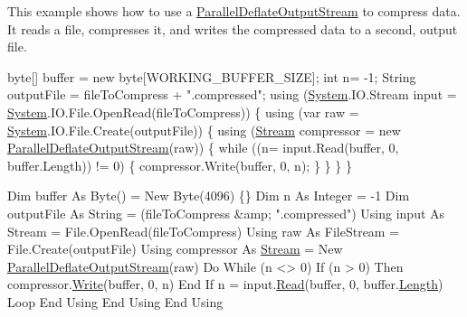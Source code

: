 This example shows how to use a \mbox{\hyperlink{class_super_tiled2_unity_1_1_ionic_1_1_zlib_1_1_parallel_deflate_output_stream}{Parallel\+Deflate\+Output\+Stream}} to compress data. It reads a file, compresses it, and writes the compressed data to a second, output file.


\begin{DoxyCode}
byte[] buffer = \textcolor{keyword}{new} byte[WORKING\_BUFFER\_SIZE];
\textcolor{keywordtype}{int} n= -1;
String outputFile = fileToCompress + \textcolor{stringliteral}{".compressed"};
\textcolor{keyword}{using} (\mbox{\hyperlink{namespace_system}{System}}.IO.Stream input = \mbox{\hyperlink{namespace_system}{System}}.IO.File.OpenRead(fileToCompress))
\{
    \textcolor{keyword}{using} (var raw = \mbox{\hyperlink{namespace_system}{System}}.IO.File.Create(outputFile))
    \{
        \textcolor{keyword}{using} (\mbox{\hyperlink{namespace_super_tiled2_unity_1_1_ionic_1_1_zip_a9ced5352c56e7e0fceff15b534073c83aeae835e83c0494a376229f254f7d3392}{Stream}} compressor = \textcolor{keyword}{new} \mbox{\hyperlink{class_super_tiled2_unity_1_1_ionic_1_1_zlib_1_1_parallel_deflate_output_stream_aba84c882116b0dbb99bdc1d939e50b0c}{ParallelDeflateOutputStream}}(raw))
        \{
            \textcolor{keywordflow}{while} ((n= input.Read(buffer, 0, buffer.Length)) != 0)
            \{
                compressor.Write(buffer, 0, n);
            \}
        \}
    \}
\}
\end{DoxyCode}
 
\begin{DoxyCode}
Dim buffer As Byte() = New Byte(4096) \{\}
Dim n As Integer = -1
Dim outputFile As String = (fileToCompress &amp; \textcolor{stringliteral}{".compressed"})
Using input As Stream = File.OpenRead(fileToCompress)
    Using raw As FileStream = File.Create(outputFile)
        Using compressor As \mbox{\hyperlink{namespace_super_tiled2_unity_1_1_ionic_1_1_zip_a9ced5352c56e7e0fceff15b534073c83aeae835e83c0494a376229f254f7d3392}{Stream}} = New \mbox{\hyperlink{class_super_tiled2_unity_1_1_ionic_1_1_zlib_1_1_parallel_deflate_output_stream_aba84c882116b0dbb99bdc1d939e50b0c}{ParallelDeflateOutputStream}}(raw)
            Do While (n <> 0)
                If (n > 0) Then
                    compressor.\mbox{\hyperlink{class_super_tiled2_unity_1_1_ionic_1_1_zlib_1_1_parallel_deflate_output_stream_a806d2664ad5782928882e0c1eab34616}{Write}}(buffer, 0, n)
                End If
                n = input.\mbox{\hyperlink{class_super_tiled2_unity_1_1_ionic_1_1_zlib_1_1_parallel_deflate_output_stream_ae7c4a06ce15004579b5b969a8c5d5db7}{Read}}(buffer, 0, buffer.\mbox{\hyperlink{class_super_tiled2_unity_1_1_ionic_1_1_zlib_1_1_parallel_deflate_output_stream_a15050442090a1fa7047790fb8dc0ad80}{Length}})
            Loop
        End Using
    End Using
End Using
\end{DoxyCode}
 



